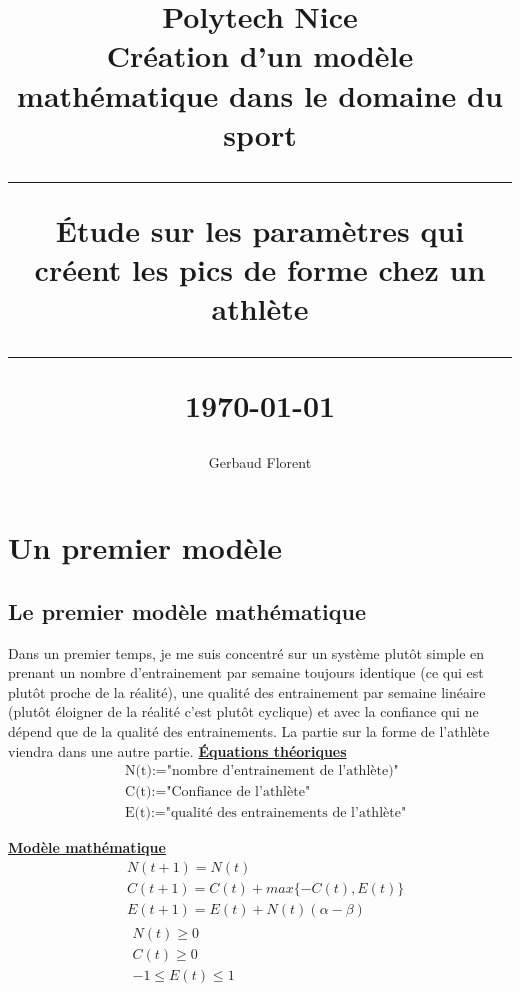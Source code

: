 \documentclass[
]{article}
\title{\textbf{\Huge Polytech Nice}\\[1cm]
	\textbf{\LARGE Création d'un modèle mathématique dans le domaine du sport}\\[2cm]
	\hrule height 1pt
	\vspace{0.5cm}
	\textbf{\Large Étude sur les paramètres qui créent les pics de forme chez un athlète}\\[0.5cm]
	\hrule height 1pt
	\vspace{3cm}
	\small{\today}}
\author{
	\begin{tabular}{c}
		Gerbaud Florent \\
	\end{tabular}
}
\date{}
\begin{document}
	\maketitle
	\newpage
	
	{
		\setcounter{tocdepth}{3}
		\renewcommand{\contentsname}{
			\hfill
			\begin{tikzpicture}
				\node[draw, fill=white, inner sep=20pt,line width=1.5pt] {\fontsize{30}{36}\selectfont\bfseries Table des matières};
			\end{tikzpicture}
			\hfill
		}
		\tableofcontents
		\pagebreak
		
	}
	\hypertarget{s1}{%
	\section{Un premier modèle }\label{s1}}
	\hypertarget{ss1}{%
		\subsection{Le premier modèle mathématique }\label{ss1}}
		Dans un premier temps, je me suis concentré sur un système plutôt simple en prenant un nombre d'entrainement par semaine toujours identique (ce qui est plutôt proche de la réalité), une qualité des entrainement par semaine linéaire (plutôt éloigner de la réalité c'est plutôt cyclique) et avec la confiance qui ne dépend que de la qualité des entrainements.
		La partie sur la forme de l'athlète viendra dans une autre partie. 
		\newline\newline 
		\underline{\textbf{Équations théoriques}}
		\newline
		\begin{align*}
			&\text{N(t):="nombre d'entrainement de l'athlète)"} \\
			&\text{C(t):="Confiance de l'athlète"} \\
			&\text{E(t):="qualité des entrainements de l'athlète"}
		\end{align*}
		
		\underline{\textbf{Modèle mathématique}}
		\newline
		\begin{align}
			&N(t+1)=N(t) \\
			&C(t+1)=C(t)+max\{-C(t),E(t)\} \\
			&E(t+1)=E(t)+N(t)(\alpha-\beta) \\
			&\boxed{\begin{array}{c} N(t) \ge 0 \\ C(t) \ge 0 \\
			-1 \le E(t) \le 1\end{array}}
		\end{align}
	
\end{document}
